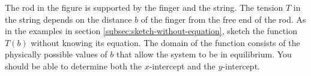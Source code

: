The rod in the figure is supported by the finger and the string.
The tension $T$ in the string depends on the distance $b$ of the
finger from the free end of the rod. 
As in the examples
in section \ref{subsec:sketch-without-equation}, sketch the function
$T(b)$ without knowing its equation. The domain of the function
consists of the physically possible values of $b$ that allow the
system to be in equilibrium. You should be able to determine
both the $x$-intercept and the $y$-intercept.

